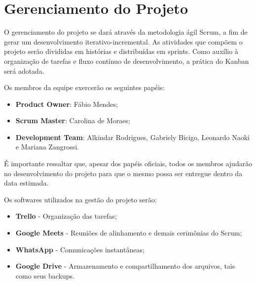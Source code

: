 \chapter{Gerenciamento do Projeto}
O gerenciamento do projeto se dará através da metodologia ágil Scrum,
a fim de gerar um desenvolvimento iterativo-incremental. As atividades
que compõem o projeto serão divididas em histórias e distribuídas em
sprints.  Como auxílio à organização de tarefas e fluxo contínuo de
desenvolvimento, a prática do Kanban será adotada.

Os membros da equipe exercerão os seguintes papéis:

\begin {itemize}
\item \textbf{Product Owner}: Fábio Mendes;
\item \textbf{Scrum Master}: Carolina de Moraes;
\item \textbf{Development Team}: Alkindar Rodrigues, Gabriely Bicigo,
  Leonardo Naoki e Mariana Zangrossi.
\end {itemize}

É importante ressaltar que, apesar dos papéis oficiais, todos os
membros ajudarão no desenvolvimento do projeto para que o mesmo possa
ser entregue dentro da data estimada.


Os softwares utilizados na gestão do projeto serão:

\begin {itemize}
\item \textbf{Trello} - Organização das tarefas;
\item \textbf{Google Meets} - Reuniões de alinhamento e demais
  cerimônias do Scrum;
\item \textbf{WhatsApp} - Comunicações instantâneas;
\item \textbf{Google Drive} - Armazenamento e compartilhamento dos
  arquivos, tais como seus backups.
\end {itemize}

